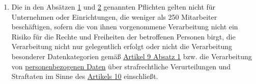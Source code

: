 \begin{enumerate}
  \item Die in den Absätzen \hyperref[itm:30-1]{1} und \hyperref[itm:30-2]{2} genannten Pflichten gelten nicht für
   Unternehmen oder Einrichtungen, die weniger als 250 Mitarbeiter beschäftigen, sofern die von ihnen vorgenommene
   Verarbeitung nicht ein Risiko für die Rechte und Freiheiten der betroffenen Personen birgt, die Verarbeitung nicht
   nur gelegentlich erfolgt oder nicht die Verarbeitung besonderer Datenkategorien gemäß \hyperref[itm:09-1]{Artikel 9
   Absatz 1} bzw. die  Verarbeitung von \hyperref[itm:04-1]{personenbezogenen Daten} über strafrechtliche Verurteilungen und Straftaten im
   Sinne des \hyperref[ch:10]{Artikels 10} einschließt.
  \label{itm:30-5}

\end{enumerate}


